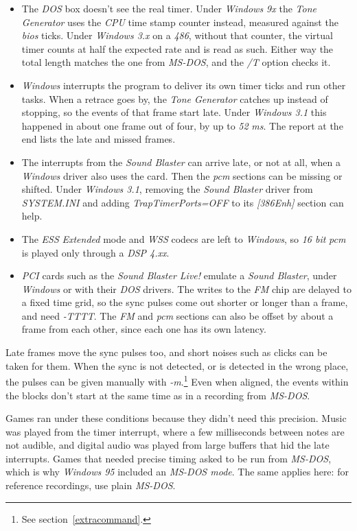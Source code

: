 \documentclass[10pt,a4paper]{report}
\newcommand{\ac}[1]{\textit{\mbox{\acrshort{#1}}}}
\begin{document}
\begin{appendices}
\begin{itemize}
	\item The \textit{DOS} box doesn't see the real timer. Under \textit{Windows 9x} the \textit{Tone Generator} uses the \textit{CPU} time stamp counter instead, measured against the \ac{bios} ticks. Under \textit{Windows 3.x} on a \textit{486}, without that counter, the virtual timer counts at half the expected rate and is read as such. Either way the total length matches the one from \textit{MS-DOS}, and the \textit{/T} option checks it.
	\item \textit{Windows} interrupts the program to deliver its own timer ticks and run other tasks. When a retrace goes by, the \textit{Tone Generator} catches up instead of stopping, so the events of that frame start late. Under \textit{Windows 3.1} this happened in about one frame out of four, by up to \textit{52} \ac{ms}. The report at the end lists the late and missed frames.
	\item The interrupts from the \textit{Sound Blaster} can arrive late, or not at all, when a \textit{Windows} driver also uses the card. Then the \ac{pcm} sections can be missing or shifted. Under \textit{Windows 3.1}, removing the \textit{Sound Blaster} driver from \textit{SYSTEM.INI} and adding \textit{TrapTimerPorts=OFF} to its \textit{[386Enh]} section can help.
	\item The \textit{ESS} \textit{Extended} mode and \textit{WSS} codecs are left to \textit{Windows}, so \textit{16 bit} \ac{pcm} is played only through a \textit{DSP 4.xx}.
	\item \textit{PCI} cards such as the \textit{Sound Blaster Live!} emulate a \textit{Sound Blaster}, under \textit{Windows} or with their \textit{DOS} drivers. The writes to the \textit{FM} chip are delayed to a fixed time grid, so the sync pulses come out shorter or longer than a frame, and need \textit{-TTTT}. The \textit{FM} and \ac{pcm} sections can also be offset by about a frame from each other, since each one has its own latency.
\end{itemize}

Late frames move the sync pulses too, and short noises such as clicks can be taken for them. When the sync is not detected, or is detected in the wrong place, the pulses can be given manually with \textit{-m}.\footnote{See section~\ref{extracommand}.} Even when aligned, the events within the blocks don't start at the same time as in a recording from \textit{MS-DOS}.

Games ran under these conditions because they didn't need this precision. Music was played from the timer interrupt, where a few milliseconds between notes are not audible, and digital audio was played from large buffers that hid the late interrupts. Games that needed precise timing asked to be run from \textit{MS-DOS}, which is why \textit{Windows 95} included an \textit{MS-DOS mode}. The same applies here: for reference recordings, use plain \textit{MS-DOS}.


\end{appendices}
\end{document}
